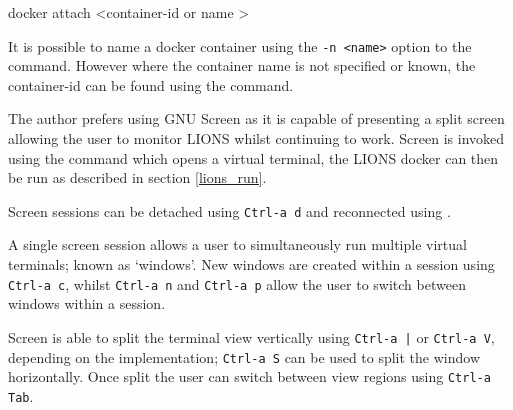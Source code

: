 \documentclass[11pt]{scrartcl}
\begin{document}
\begin{bash}
docker attach <container-id or name >
\end{bash}

It is possible to name a docker container using the \texttt{-n <name>} option to the  command. However where the container name is not specified or known,
the container-id can be found using the  command.

\vspace{2em}

The author prefers using GNU Screen as it is capable of presenting a split screen allowing the user to monitor LIONS whilst continuing to work. 
Screen is invoked using the command  which opens a virtual terminal, the LIONS docker can then be run as described in section \ref{lions_run}. 

Screen sessions can be detached using \texttt{Ctrl-a d} and reconnected using . 

A single screen session allows a user to simultaneously run multiple virtual terminals; known as `windows'. New windows are created within a session using \texttt{Ctrl-a c}, whilst \texttt{Ctrl-a n} and \texttt{Ctrl-a p} allow the user to switch between windows within a session.

Screen is able to split the terminal view vertically using \texttt{Ctrl-a |} or \texttt{Ctrl-a V}, depending on the implementation; \texttt{Ctrl-a S} can be used to split the window horizontally. Once split the user can switch between view regions using \texttt{Ctrl-a Tab}.


\end{document}
